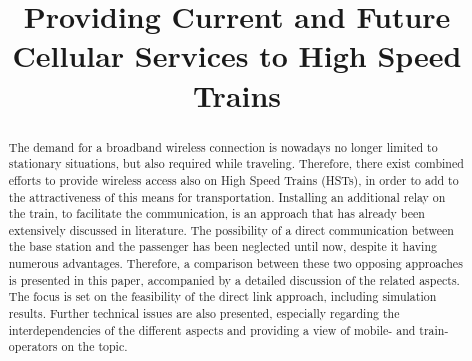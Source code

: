 \documentclass[a4paper,conference,twocolumn,10pt]{IEEEtran}
\begin{document}
\begin{acronym}
\end{acronym}  
\title{Providing Current and Future Cellular Services to High Speed Trains}
\author{
}

\maketitle




\newpage

\begin{abstract}
The demand for a broadband wireless connection is nowadays no longer limited to stationary situations, but also required while traveling. Therefore, there exist combined efforts to provide wireless access also on High Speed Trains (HSTs), in order to add to the attractiveness of this means for transportation. Installing an additional relay on the train, to facilitate the communication, is an approach that has already been extensively discussed in literature. The possibility of a direct communication between the base station and the passenger has been neglected until now, despite it having numerous advantages. Therefore, a comparison between these two opposing approaches is presented in this paper, accompanied by a detailed discussion of the related aspects. The focus is set on the feasibility of the direct link approach, including simulation results. Further technical issues are also presented, especially regarding the interdependencies of the different aspects and providing a view of mobile- and train-operators on the topic.
\end{abstract}
\end{document}
